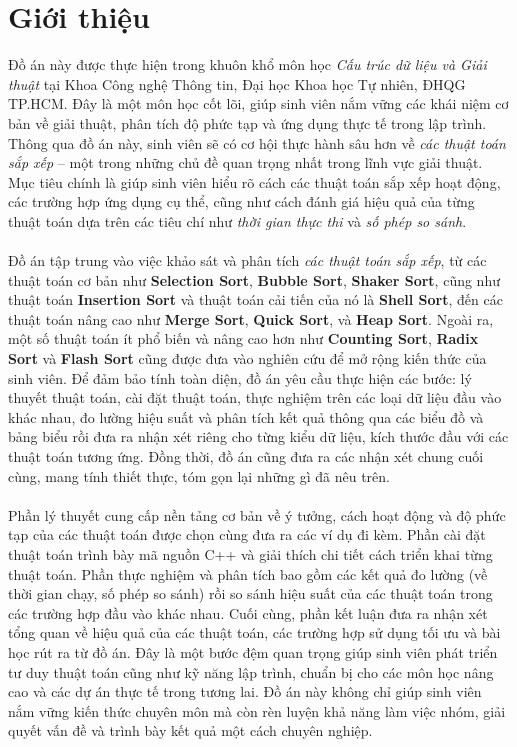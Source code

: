 \section{Giới thiệu}

Đồ án này được thực hiện trong khuôn khổ môn học \textit{Cấu trúc dữ liệu 
và Giải thuật} tại Khoa Công nghệ Thông tin, Đại học Khoa học Tự nhiên, 
ĐHQG TP.HCM. Đây là một môn học cốt lõi, giúp sinh viên nắm vững các 
khái niệm cơ bản về giải thuật, phân tích độ phức tạp và ứng dụng 
thực tế trong lập trình. Thông qua đồ án này, sinh viên sẽ có cơ hội 
thực hành sâu hơn về \textit{các thuật toán sắp xếp} – một trong những chủ đề 
quan trọng nhất trong lĩnh vực giải thuật. Mục tiêu chính là giúp 
sinh viên hiểu rõ cách các thuật toán sắp xếp hoạt động, các trường hợp 
ứng dụng cụ thể, cũng như cách đánh giá hiệu quả của từng thuật toán 
dựa trên các tiêu chí như \textit{thời gian thực thi} và \textit{số phép so sánh}.
\\\\
Đồ án tập trung vào việc khảo sát và phân tích \textit{các thuật toán sắp 
xếp}, từ các thuật toán cơ bản như \textbf{Selection Sort}, \textbf{Bubble 
Sort}, \textbf{Shaker Sort}, cũng như thuật toán \textbf{Insertion Sort} 
và thuật toán cải tiến của nó là \textbf{Shell Sort}, đến các thuật toán 
nâng cao như \textbf{Merge Sort}, \textbf{Quick Sort}, và \textbf{Heap 
Sort}. Ngoài ra, một số thuật toán ít phổ biến và nâng cao hơn như 
\textbf{Counting Sort}, \textbf{Radix Sort} và \textbf{Flash Sort} cũng 
được đưa vào nghiên cứu để mở rộng kiến thức của sinh viên. Để đảm bảo 
tính toàn diện, đồ án yêu cầu thực hiện các bước: lý thuyết thuật toán, 
cài đặt thuật toán, thực nghiệm trên các loại dữ liệu đầu vào khác nhau, 
đo lường hiệu suất và phân tích kết quả thông qua các biểu đồ và bảng 
biểu rồi đưa ra nhận xét riêng cho từng kiểu dữ liệu, kích thước đầu với 
các thuật toán tương ứng. Đồng thời, đồ án cũng đưa ra các nhận xét chung 
cuối cùng, mang tính thiết thực, tóm gọn lại những gì đã nêu trên.
\\\\
Phần lý thuyết cung cấp nền tảng cơ bản về ý tưởng, cách hoạt động và độ 
phức tạp của các thuật toán được chọn cùng đưa ra các ví dụ đi kèm. Phần 
cài đặt thuật toán trình bày mã nguồn C++ và giải thích chi tiết cách 
triển khai từng thuật toán. Phần thực nghiệm và phân tích bao gồm các 
kết quả đo lường (về thời gian chạy, số phép so sánh) rồi so sánh hiệu 
suất của các thuật toán trong các trường hợp đầu vào khác nhau. Cuối cùng, 
phần kết luận đưa ra nhận xét tổng quan về hiệu quả của các thuật toán, 
các trường hợp sử dụng tối ưu và bài học rút ra từ đồ án. Đây là một bước 
đệm quan trọng giúp sinh viên phát triển tư duy thuật toán cũng như kỹ 
năng lập trình, chuẩn bị cho các môn học nâng cao và các dự án thực tế 
trong tương lai. Đồ án này không chỉ giúp sinh viên nắm vững kiến thức 
chuyên môn mà còn rèn luyện khả năng làm việc nhóm, giải quyết vấn đề và 
trình bày kết quả một cách chuyên nghiệp. 
